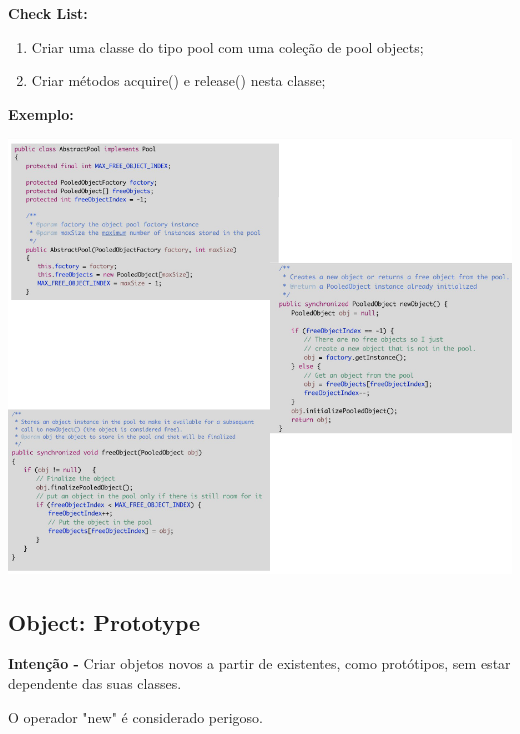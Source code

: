 \documentclass{article}
\begin{document}
\begin{flushleft}
    \textbf{Check List:}

    \begin{enumerate}
        \item Criar uma classe do tipo pool com uma coleção de pool objects;
        \item Criar métodos acquire() e release() nesta classe;
    \end{enumerate}
\end{flushleft}

\pagebreak

\begin{flushleft}
    \textbf{Exemplo:}

    \begin{center}
        \includegraphics[scale=0.5]{Images/36.png}
    \end{center}
\end{flushleft}

\pagebreak

\subsection{Object: Prototype}

\begin{flushleft}
    \textbf{Intenção -} Criar objetos novos a partir de existentes, como protótipos, sem estar dependente
    das suas classes.

    O operador "new" é considerado perigoso.
\end{flushleft}
\end{document}
